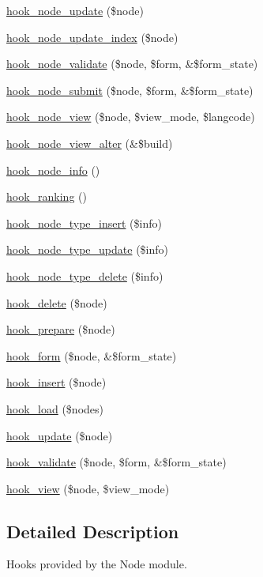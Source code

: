 \begin{DoxyCompactItemize}
\item 
\hyperlink{group__node__api__hooks_gac66c767cc922fcbfdaf17252e5d87d9d}{hook\_\-node\_\-update} (\$node)
\item 
\hyperlink{group__node__api__hooks_gac8420f204c69a4dc641f4d809a870b05}{hook\_\-node\_\-update\_\-index} (\$node)
\item 
\hyperlink{group__node__api__hooks_gad26227eaf0dd513134767a11be40ab1d}{hook\_\-node\_\-validate} (\$node, \$form, \&\$form\_\-state)
\item 
\hyperlink{group__node__api__hooks_ga1b479b731ecb3f9eec0c92e3e1a8e01d}{hook\_\-node\_\-submit} (\$node, \$form, \&\$form\_\-state)
\item 
\hyperlink{group__node__api__hooks_ga475290ee8e81a2373ea17c512cc3f9a9}{hook\_\-node\_\-view} (\$node, \$view\_\-mode, \$langcode)
\item 
\hyperlink{group__node__api__hooks_gad5ece824736be57bf0020af900398b94}{hook\_\-node\_\-view\_\-alter} (\&\$build)
\item 
\hyperlink{group__node__api__hooks_ga3b6ad51d7815d1cdd093b0e0f350cbd0}{hook\_\-node\_\-info} ()
\item 
\hyperlink{group__node__api__hooks_gaf7a28ce3230dc96833ea5338fd26f43c}{hook\_\-ranking} ()
\item 
\hyperlink{group__hooks_ga8941b418846350a7edbd67ac388a5dfb}{hook\_\-node\_\-type\_\-insert} (\$info)
\item 
\hyperlink{group__hooks_ga7518f336bfbd131259f520fcd45ba710}{hook\_\-node\_\-type\_\-update} (\$info)
\item 
\hyperlink{group__hooks_ga35ae5b1a494322b02d03ae00a98ac77b}{hook\_\-node\_\-type\_\-delete} (\$info)
\item 
\hyperlink{group__node__api__hooks_ga8588d8a814e8aef059d9e0f842904b35}{hook\_\-delete} (\$node)
\item 
\hyperlink{group__node__api__hooks_ga2dff6dd92802df6b776a4eeb0b1a737c}{hook\_\-prepare} (\$node)
\item 
\hyperlink{group__node__api__hooks_ga52618ef4643a60878dd5a76ff9bbff30}{hook\_\-form} (\$node, \&\$form\_\-state)
\item 
\hyperlink{group__node__api__hooks_ga3c6a28d33e07d3506e1eb99718ef4e39}{hook\_\-insert} (\$node)
\item 
\hyperlink{group__node__api__hooks_ga49065b040d7fb3e02889eda6361dac34}{hook\_\-load} (\$nodes)
\item 
\hyperlink{group__node__api__hooks_gaf9c98e3839e9405df42b50c8cdfa9dca}{hook\_\-update} (\$node)
\item 
\hyperlink{group__node__api__hooks_gacaf7cff104c642c28f76ce7ec5f33f40}{hook\_\-validate} (\$node, \$form, \&\$form\_\-state)
\item 
\hyperlink{group__node__api__hooks_gab1f229603b5e0f2f9d9e2a3ab53dcbda}{hook\_\-view} (\$node, \$view\_\-mode)
\end{DoxyCompactItemize}


\subsection{Detailed Description}
Hooks provided by the Node module. 